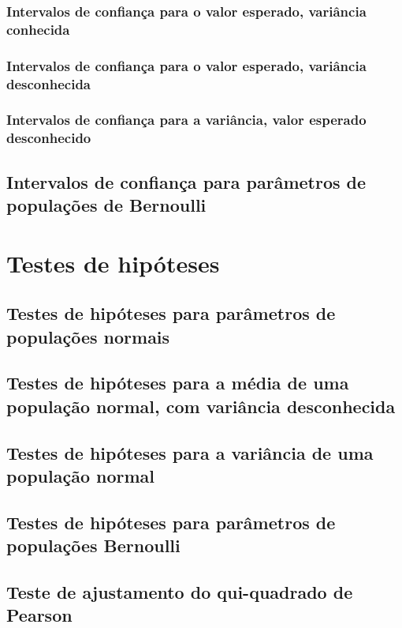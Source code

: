 \documentclass[11pt, a4paper]{article}
\begin{document}
\subsubsection*{Intervalos de confiança para o valor esperado, variância conhecida}


\subsubsection*{Intervalos de confiança para o valor esperado, variância desconhecida}


\subsubsection*{Intervalos de confiança para a variância, valor esperado desconhecido}


\subsection{Intervalos de confiança para parâmetros de populações de Bernoulli}


\vspace{20pt}
\section{Testes de hipóteses}

\subsection{Testes de hipóteses para parâmetros de populações normais}

\subsection{Testes de hipóteses para a média de uma população normal, com variância desconhecida}

\subsection{Testes de hipóteses para a variância de uma população normal}

\subsection{Testes de hipóteses para parâmetros de populações Bernoulli}

\subsection{Teste de ajustamento do qui-quadrado de Pearson}
\end{document}
